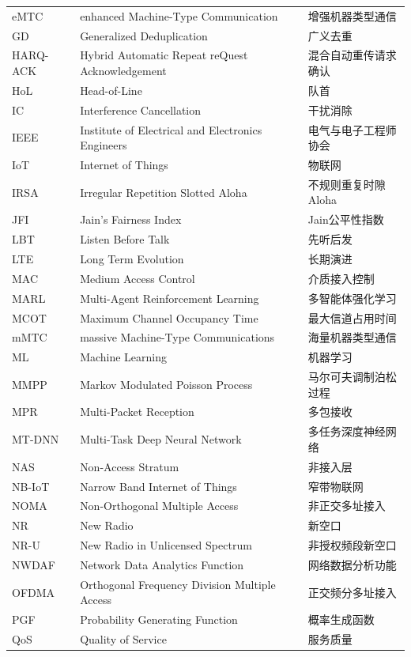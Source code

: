 \begin{longtable}{p{2.5cm}p{8cm}p{5cm}}
	eMTC & enhanced Machine-Type Communication & 增强机器类型通信 \\
	GD & Generalized Deduplication & 广义去重 \\
	HARQ-ACK & Hybrid Automatic Repeat reQuest Acknowledgement & 混合自动重传请求确认 \\
	HoL & Head-of-Line & 队首 \\
	IC & Interference Cancellation & 干扰消除 \\
	IEEE & Institute of Electrical and Electronics Engineers & 电气与电子工程师协会 \\
	IoT & Internet of Things & 物联网 \\
	IRSA & Irregular Repetition Slotted Aloha & 不规则重复时隙Aloha \\
	JFI & Jain's Fairness Index & Jain公平性指数 \\
	LBT & Listen Before Talk & 先听后发 \\
	LTE & Long Term Evolution & 长期演进 \\
	MAC & Medium Access Control & 介质接入控制 \\
	MARL & Multi-Agent Reinforcement Learning & 多智能体强化学习 \\
	MCOT & Maximum Channel Occupancy Time & 最大信道占用时间 \\
	mMTC & massive Machine-Type Communications & 海量机器类型通信 \\
	ML & Machine Learning & 机器学习 \\
	MMPP & Markov Modulated Poisson Process & 马尔可夫调制泊松过程 \\
	MPR & Multi-Packet Reception & 多包接收 \\
	MT-DNN & Multi-Task Deep Neural Network & 多任务深度神经网络 \\
	NAS & Non-Access Stratum & 非接入层 \\
	NB-IoT & Narrow Band Internet of Things & 窄带物联网 \\
	NOMA & Non-Orthogonal Multiple Access & 非正交多址接入 \\
	NR & New Radio & 新空口 \\
	NR-U & New Radio in Unlicensed Spectrum & 非授权频段新空口 \\
	NWDAF & Network Data Analytics Function & 网络数据分析功能 \\
	OFDMA & Orthogonal Frequency Division Multiple Access & 正交频分多址接入 \\
	PGF & Probability Generating Function & 概率生成函数 \\
	QoS & Quality of Service & 服务质量 \\

\end{longtable}
